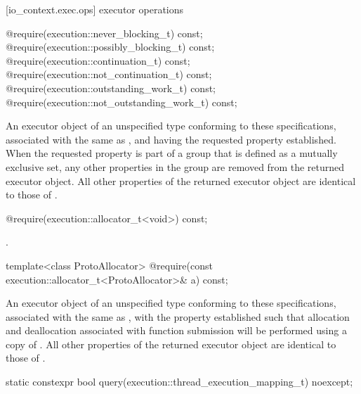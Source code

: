 [io_context.exec.ops]{ executor operations}

\begin{itemdecl}
@\seebelow@ require(execution::never_blocking_t) const;
@\seebelow@ require(execution::possibly_blocking_t) const;
@\seebelow@ require(execution::continuation_t) const;
@\seebelow@ require(execution::not_continuation_t) const;
@\seebelow@ require(execution::outstanding_work_t) const;
@\seebelow@ require(execution::not_outstanding_work_t) const;
\end{itemdecl}

\begin{itemdescr}
\pnum
\returns An executor object of an unspecified type conforming to these specifications, associated with the same  as , and having the requested property established. When the requested property is part of a group that is defined as a mutually exclusive set, any other properties in the group are removed from the returned executor object. All other properties of the returned executor object are identical to those of .
\end{itemdescr}

\begin{itemdecl}
@\seebelow@ require(execution::allocator_t<void>) const;
\end{itemdecl}

\begin{itemdescr}
\pnum
\returns {}.
\end{itemdescr}

\begin{itemdecl}
template<class ProtoAllocator>
  @\seebelow@ require(const execution::allocator_t<ProtoAllocator>& a) const;
\end{itemdecl}

\begin{itemdescr}
\pnum
\returns An executor object of an unspecified type conforming to these specifications, associated with the same  as , with the  property established such that allocation and deallocation associated with function submission will be performed using a copy of . All other properties of the returned executor object are identical to those of .
\end{itemdescr}

\begin{itemdecl}
static constexpr bool query(execution::thread_execution_mapping_t) noexcept;
\end{itemdecl}

